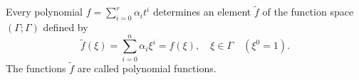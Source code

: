 Every polynomial $f = \sum_{i=0}^{r} \alpha_i t^i$ determines an element $\tilde{f}$ of the function space $(\Gamma; \Gamma)$ defined by
$$\tilde{f}(\xi) = \sum_{i=0}^{n} \alpha_i \xi^i = f(\xi), \quad \xi \in \Gamma \quad (\xi^0 = 1).$$
The functions $\tilde{f}$ are called polynomial functions.
